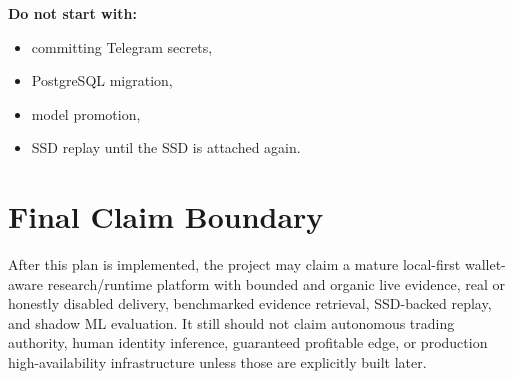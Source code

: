 \documentclass{article}
\begin{document}
\textbf{Do not start with:}
\begin{itemize}[nosep]
\item committing Telegram secrets,
\item PostgreSQL migration,
\item model promotion,
\item SSD replay until the SSD is attached again.
\end{itemize}

\section*{Final Claim Boundary}
After this plan is implemented, the project may claim a mature local-first wallet-aware research/runtime platform with bounded and organic live evidence, real or honestly disabled delivery, benchmarked evidence retrieval, SSD-backed replay, and shadow ML evaluation. It still should not claim autonomous trading authority, human identity inference, guaranteed profitable edge, or production high-availability infrastructure unless those are explicitly built later.
\end{document}

